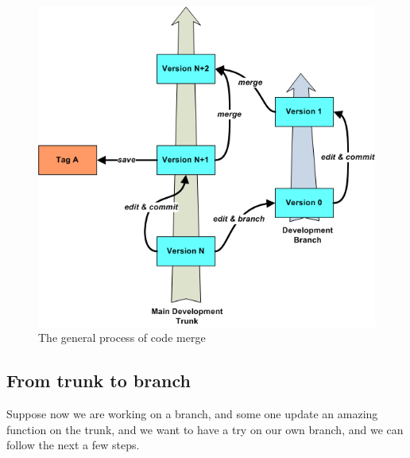 \begin{figure}[h]
\label{fig:fig_merge}
\begin{center}
\includegraphics[scale=0.5]{./data/svn_merge.png}
\caption{The general process of code merge}
\end{center}
\end{figure}	


\subsection{From trunk to branch}
Suppose now we are working on a branch, and some one update an amazing function on the trunk, and we want to have a try on our own branch, and we can follow the next a few steps.

